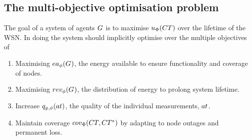 \subsection{The multi-objective optimisation problem}
\label{section:optimisation_problem}

The goal of a system of agents $G_{}^{}$ is to maximise $\functionSystemUtility{}{}$ over the lifetime of the WSN. In doing the system should   implicitly optimise over the multiple objectives of
\begin{enumerate}
	\item Maximising $\functionEnergyAvailable{}{}$, the energy available to ensure functionality and coverage of nodes.
	\item Maximising $\functionEnergyVariability{}{}$,  the distribution of energy to prolong system lifetime.
	\item Increase $\functionAtomicTaskQualitySignature{}{}$, the quality of the individual measurements, $\varAtomicTask{}{}$.
	\item Maintain coverage $\functionSystemCoverage{}{}$ by adapting to node outages and permanent loss.
\end{enumerate}